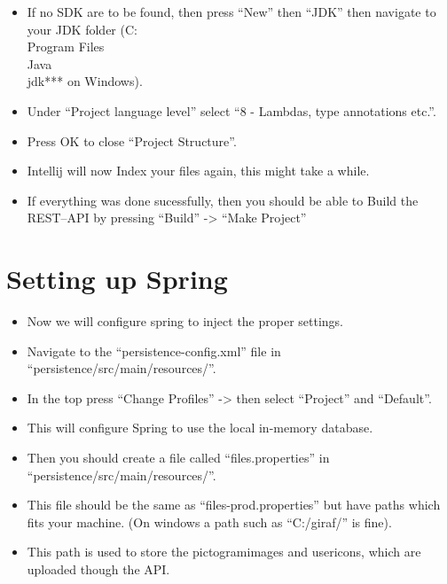 \begin{itemize}
    \item If no SDK are to be found, then press ``New'' then ``JDK'' then navigate to your JDK folder (C:\\Program Files\\Java\\jdk*** on Windows).
    \item Under ``Project language level'' select ``8 - Lambdas, type annotations etc.''.
    \item Press OK to close ``Project Structure''.
    \item Intellij will now Index your files again, this might take a while.
    \item If everything was done sucessfully, then you should be able to Build the REST--API by pressing ``Build'' -> ``Make Project''
\end{itemize}

\section{Setting up Spring}
\begin{itemize}
    \item Now we will configure spring to inject the proper settings.
    \item Navigate to the ``persistence-config.xml'' file in ``persistence/src/main/resources/''.
    \item In the top press ``Change Profiles'' -> then select ``Project'' and ``Default''.
    \item This will configure Spring to use the local in-memory database.
    \item Then you should create a file called ``files.properties'' in ``persistence/src/main/resources/''.
    \item This file should be the same as ``files-prod.properties'' but have paths which fits your machine. (On windows a path such as ``C:/giraf/''
is fine).
    \item This path is used to store the pictogramimages and usericons, which are uploaded though the API.
\end{itemize}

